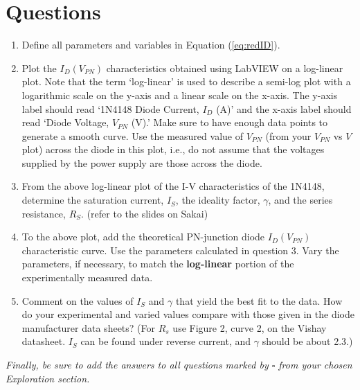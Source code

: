 \documentclass[12pt]{../manual}
\begin{document}
\newpage
\section{Questions}
\begin{enumerate}
\item Define all parameters and variables in Equation (\ref{eq:redID}).
\item Plot the $I_D(V_{PN})$ characteristics obtained using LabVIEW on a log-linear plot. Note that the term `log-linear' is used to describe a semi-log plot with a logarithmic scale on the y-axis and a linear scale on the x-axis. The y-axis label should read `1N4148 Diode Current, $I_D$ (A)' and the x-axis label should read `Diode Voltage, $V_{PN}$ (V).' Make sure to have enough data points to generate a smooth curve. Use the measured value of $V_{PN}$ (from your $V_{PN}$ vs $V$ plot) across the diode in this plot, i.e., do not assume that the voltages supplied by the power supply are those across the diode.
\item From the above log-linear plot of the I-V characteristics of the 1N4148, determine the saturation current, $I_S$, the ideality factor, $\gamma$, and the series resistance, $R_S$. (refer to the slides on Sakai)
\item To the above plot, add the theoretical PN-junction diode $I_D(V_{PN})$ characteristic curve. Use the parameters calculated in question 3. Vary the parameters, if necessary, to match the \textbf{log-linear} portion of the experimentally measured data.
\item Comment on the values of $I_S$ and $\gamma$ that yield the best fit to the data. How do your experimental and varied values compare with those given in the diode manufacturer data sheets? (For $R_s$ use Figure 2, curve 2, on the Vishay datasheet. $I_S$ can be found under reverse current, and $\gamma$ should be about 2.3.)
\end{enumerate}
\textit{Finally, be sure to add the answers to all questions marked by $\square$ from your chosen Exploration section.}
\end{document}
